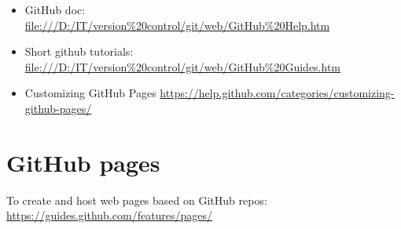 \documentclass{report}
\begin{document}
\begin{itemize}

\item GitHub doc:\\
\url{file:///D:/IT/version%20control/git/web/GitHub%20Help.htm}

\item Short github tutorials:\\
\url{file:///D:/IT/version%20control/git/web/GitHub%20Guides.htm}

\item Customizing GitHub Pages
\url{https://help.github.com/categories/customizing-github-pages/}
\end{itemize}

\section{GitHub pages}
To create and host web pages based on GitHub repos:\\
\url{https://guides.github.com/features/pages/}
\end{document}
